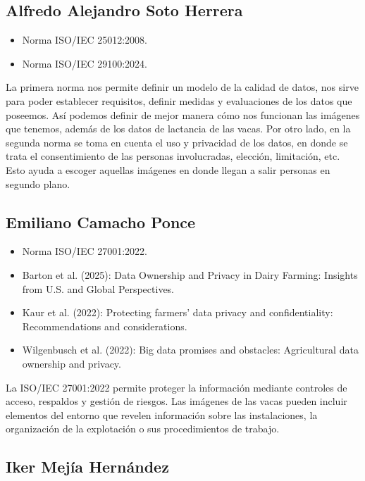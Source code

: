 \subsection{Alfredo Alejandro Soto Herrera}

\begin{itemize}
  \item Norma ISO/IEC 25012:2008.
  \item Norma ISO/IEC 29100:2024.
\end{itemize}

La primera norma nos permite definir un modelo de la calidad de datos, nos sirve para poder establecer requisitos, definir medidas y evaluaciones de los datos que poseemos. Así podemos definir de mejor manera cómo nos funcionan las imágenes que tenemos, además de los datos de lactancia de las vacas. Por otro lado, en la segunda norma se toma en cuenta el uso y privacidad de los datos, en donde se trata el consentimiento de las personas involucradas, elección, limitación, etc. Esto ayuda a escoger aquellas imágenes en donde llegan a salir personas en segundo plano.

\subsection{Emiliano Camacho Ponce}

\begin{itemize}
  \item Norma ISO/IEC 27001:2022.
  \item Barton et al. (2025): Data Ownership and Privacy in Dairy Farming: Insights from U.S. and Global Perspectives.
  \item Kaur et al. (2022): Protecting farmers' data privacy and confidentiality: Recommendations and considerations.
  \item Wilgenbusch et al. (2022): Big data promises and obstacles: Agricultural data ownership and privacy.
\end{itemize}

La ISO/IEC 27001:2022 permite proteger la información mediante controles de acceso, respaldos y gestión de riesgos. Las imágenes de las vacas pueden incluir elementos del entorno que revelen información sobre las instalaciones, la organización de la explotación o sus procedimientos de trabajo.

\subsection{Iker Mejía Hernández}

